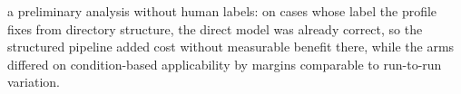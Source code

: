 a preliminary analysis without human labels: on cases whose label the profile fixes from directory structure, the
direct model was already correct, so the structured pipeline added cost without measurable benefit there, while the arms
differed on condition-based applicability by margins comparable to run-to-run variation.